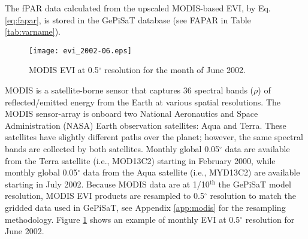 \noindent The fPAR data calculated from the upscaled MODIS-based EVI, by Eq. \ref{eq:fapar}, is stored in the GePiSaT database (see FAPAR in Table \ref{tab:varname}).
\begin{figure}[ht!]
    \texttt{[image: evi\_2002-06.eps]}
    \caption{MODIS EVI at 0.5$^{\circ}$ resolution for the month of June 
    2002.}
    \label{fig:modisevi}
\end{figure}

MODIS is a satellite-borne sensor that captures 36 spectral bands ($\rho$) of reflected/emitted energy from the Earth at various spatial resolutions.  
The MODIS sensor-array is onboard two National Aeronautics and Space Administration (NASA) Earth observation satellites: Aqua and Terra.  
These satellites have slightly different paths over the planet; however, the same spectral bands are collected by both satellites.  
Monthly global 0.05$^\circ$ data are available from the Terra satellite (i.e., MOD13C2) starting in February 2000, while monthly global 0.05$^\circ$ data from the Aqua satellite (i.e., MYD13C2) are available starting in July 2002.  
Because MODIS data are at 1/10$^{\text{th}}$ the GePiSaT model resolution, MODIS EVI products are resampled to 0.5$^{\circ}$ resolution to match the gridded data used in GePiSaT, see Appendix \ref{app:modis} for the resampling methodology.
Figure \ref{fig:modisevi} shows an example of monthly EVI at 0.5$^{\circ}$ resolution for June 2002. 

